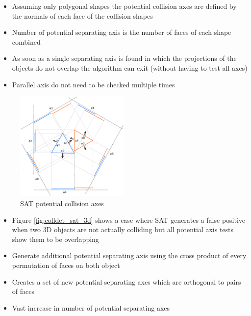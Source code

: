 \documentclass[a4paper]{article}
\begin{document}

\begin{itemize}
  \item
    Assuming only polygonal shapes the potential collision axes are defined by
    the normals of each face of the collision shapes

  \item
    Number of potential separating axis is the number of faces of each shape
    combined

  \item
    As soon as a single separating axis is found in which the projections of the
    objects do not overlap the algorithm can exit (without having to test all
    axes)

  \item
    Parallel axis do not need to be checked multiple times

\end{itemize}

\begin{figure}[h!]
  \centering
  \includegraphics[width=0.5\textwidth]{graphics/coll_det_sat_axes.eps}
  \caption{SAT potential collision axes}
  \label{fig:coll_det_sat_axes}
\end{figure}
\FloatBarrier


\begin{itemize}
  \item
    Figure \ref{fig:colldet_sat_3d} shows a case where SAT generates a false
    positive when two 3D objects are not actually colliding but all potential
    axis tests show them to be overlapping

  \item
    Generate additional potential separating axis using the cross product of
    every permutation of faces on both object

  \item
    Creates a set of new potential separating axes which are orthogonal to pairs
    of faces

  \item
    Vast increase in number of potential separating axes

\end{itemize}
\end{document}
